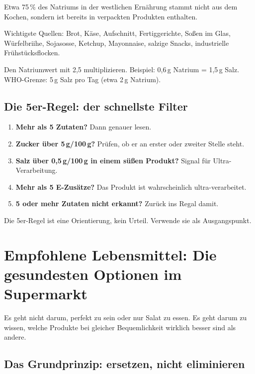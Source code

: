 \documentclass[a5paper,12pt,oneside,openany]{book}
\newcommand{\boxinfo}[2]{%
  \begin{tcolorbox}[kastenbase,
    colback=blauinfo!8!white, colframe=blauinfo, title={#1}]
  #2\end{tcolorbox}}
\begin{document}
Etwa 75\,\% des Natriums in der westlichen Ern\"{a}hrung stammt nicht aus dem
Kochen, sondern ist bereits in verpackten Produkten enthalten.

Wichtigste Quellen: Brot, K\"{a}se, Aufschnitt, Fertiggerichte, So{\ss}en im
Glas, W\"{u}rfelbriihe, Sojasosse, Ketchup, Mayonnaise, salzige Snacks,
industrielle Fr\"{u}hst\"{u}cksflocken.

\boxinfo{Umrechnung Natrium in Salz}{Den Natriumwert mit 2,5 multiplizieren.
Beispiel: 0,6\,g Natrium = 1,5\,g Salz. WHO-Grenze: 5\,g Salz pro Tag
(etwa 2\,g Natrium).}

\section{Die 5er-Regel: der schnellste Filter}

\begin{enumerate}
  \item \textbf{Mehr als 5 Zutaten?} Dann genauer lesen.
  \item \textbf{Zucker \"{u}ber 5\,g/100\,g?} Pr\"{u}fen, ob er an erster
    oder zweiter Stelle steht.
  \item \textbf{Salz \"{u}ber 0,5\,g/100\,g in einem s\"{u}{\ss}en Produkt?}
    Signal f\"{u}r Ultra-Verarbeitung.
  \item \textbf{Mehr als 5 E-Zus\"{a}tze?} Das Produkt ist wahrscheinlich
    ultra-verarbeitet.
  \item \textbf{5 oder mehr Zutaten nicht erkannt?} Zur\"{u}ck ins Regal damit.
\end{enumerate}

\boxinfo{Beachte}{Die 5er-Regel ist eine Orientierung, kein Urteil. Verwende
sie als Ausgangspunkt.}

\chapter{Empfohlene Lebensmittel: Die gesundesten Optionen im Supermarkt}

Es geht nicht darum, perfekt zu sein oder nur Salat zu essen. Es geht darum
zu wissen, welche Produkte bei gleicher Bequemlichkeit wirklich besser sind
als andere.

\section{Das Grundprinzip: ersetzen, nicht eliminieren}
\end{document}
